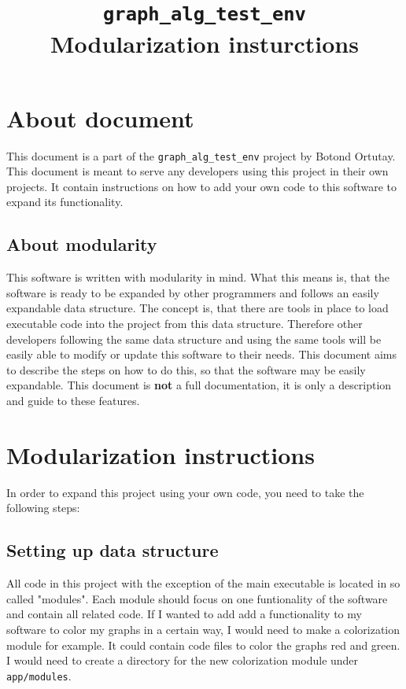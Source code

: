 \documentclass{article}
\title{\Large{\texttt{graph\_alg\_test\_env}} \\ \LARGE{\textbf{Modularization insturctions}}}
\begin{document}
\maketitle
\pagebreak

\section{About document}
This document is a part of the \texttt{graph\_alg\_test\_env} project by 
Botond Ortutay. This document is meant to serve any developers using this 
project in their own projects. It contain instructions on how to add your own 
code to this software to expand its functionality. 
\subsection{About modularity}
This software is written with modularity in mind. What this means is, that the 
software is ready to be expanded by other programmers and follows an easily 
expandable data structure. The concept is, that there are tools in place to 
load executable code into the project from this data structure. Therefore 
other developers following the same data structure and using the same tools 
will be easily able to modify or update this software to their needs. This 
document aims to describe the steps on how to do this, so that the software 
may be easily expandable. This document is \textbf{not} a full documentation, 
it is only a description and guide to these features.

\section{Modularization instructions}
In order to expand this project using your own code, you need to take the 
following steps:
\subsection{Setting up data structure}
All code in this project with the exception of the main executable is located 
in so called "modules". Each module should focus on one funtionality of the 
software and contain all related code. If I wanted to add add a 
functionality to my software to color my graphs in a certain way, I would need 
to make a colorization module for example. It could contain code files to 
color the graphs red and green. I would need to create a directory for the new 
colorization module under \texttt{app/modules}.
\end{document}
